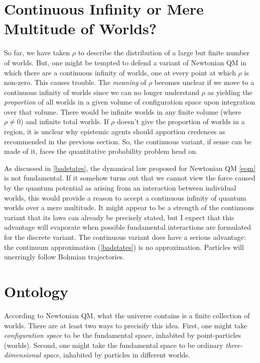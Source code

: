 \documentclass[onecolumn,secnumarabic,balancelastpage,amsmath,amssymb,nofootinbib]{article}
\begin{document}
\section{Continuous Infinity or Mere Multitude of Worlds?}\label{multitude}

So far, we have taken $\rho$ to describe the distribution of a large but finite number of worlds.  But, one might be tempted to defend a variant of Newtonian QM in which there are a continuous infinity of worlds, one at every point at which $\rho$ is non-zero.  This causes trouble.  The \emph{meaning} of $\rho$ becomes unclear if we move to a continuous infinity of worlds since we can no longer understand $\rho$ as yielding the \emph{proportion} of all worlds in a given volume of configuration space upon integration over that volume.  There would be infinite worlds in any finite volume (where $\rho\neq 0$) and infinite total worlds.  If $\rho$ doesn't give the proportion of worlds in a region, it is unclear why epistemic agents should apportion credences as recommended in the previous section.  So, the continuous variant, if sense can be made of it, faces the quantitative probability problem head on.

As discussed in \textsection \ref{badstates}, the dynamical law proposed for Newtonian QM \eqref{eom} is not fundamental.  If it somehow turns out that we cannot view the force caused by the quantum potential as arising from an interaction between individual worlds, this would provide a reason to accept a continuous infinity of quantum worlds over a mere multitude.  It might appear to be a strength of the continuous variant that its laws can already be precisely stated, but I expect that this advantage will evaporate when possible fundamental interactions are formulated for the discrete variant.  The continuous variant does have a serious advantage:  the continuum approximation (\textsection \ref{badstates}) is no approximation.  Particles will unerringly follow Bohmian trajectories.

\section{Ontology}\label{ontology}

According to Newtonian QM, what the universe contains is a finite collection of worlds.  There are at least two ways to precisify this idea.  First, one might take \emph{configuration space} to be the fundamental space, inhabited by point-particles (worlds).  Second, one might take the fundamental space to be ordinary \emph{three-dimensional space}, inhabited by particles in different worlds.
\end{document}
